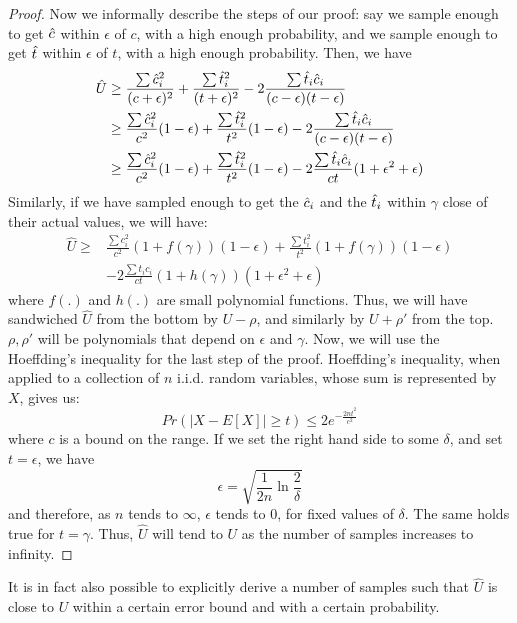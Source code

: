 {\begin{proof}
Now we informally describe the steps of our proof:
say we sample enough to get $\hat{c}$ within $\epsilon$ of $c$, with a high enough probability,
and we sample enough to get $\hat{t}$ within $\epsilon$ of $t$, with a high enough probability.
Then, we have 
\begin{align*}
\hat{U} & \geq \frac{\sum{\hc_i^2}}{(c + \epsilon)^2} +  \frac{\sum{\htt_i^2}}{(t + \epsilon)^2} - 2 \frac{\sum{\htt_i \hc_i}}{(c - \epsilon) (t - \epsilon)} \\
& \geq \frac{\sum{\hc_i^2}}{c^2} (1 - \epsilon ) +  \frac{\sum{\htt_i^2}}{t ^2} (1-\epsilon) - 2 \frac{\sum{\htt_i \hc_i}}{(c - \epsilon) (t - \epsilon)} \\
& \geq \frac{\sum{\hc_i^2}}{c^2} (1 - \epsilon ) +  \frac{\sum{\htt_i^2}}{t ^2} (1-\epsilon) - 2 \frac{\sum{\htt_i \hc_i}}{ct}(1 + \epsilon^2 + \epsilon) 
\end{align*}
Similarly, if we have sampled enough to get the $\hat{c}_i$ and the $\hat{t}_i$ within $\gamma$ close 
of their actual values, we will have:
\begin{align*}
\hat{U} \geq &  \frac{\sum{c_i^2}}{c^2} (1 + f(\gamma)) (1 - \epsilon ) +   \frac{\sum{t_i^2}}{t ^2}  (1 + f(\gamma)) (1-\epsilon) \\ & - 2 \frac{\sum{t_i c_i}}{ct}(1 + h(\gamma))(1 + \epsilon^2 + \epsilon) 
\end{align*}
where $f(.)$ and $h(.)$ are small polynomial functions.
Thus,
we will have sandwiched $\hat{U}$ from the bottom by $U-\rho$,
and similarly by $U + \rho'$ from the top.
$\rho, \rho'$ will be polynomials that depend on $\epsilon$ and $\gamma$.
Now, we will use the Hoeffding's inequality for the last step of the proof.
Hoeffding's inequality, when
applied to a collection of $n$ i.i.d. random variables,
whose sum is represented by $X$, gives us:
\begin{equation}
Pr (|X - E[X]| \geq t) \leq 2 e^{-\frac{2 n t^2}{c^2}}
\end{equation}
where $c$ is a bound on the range. 
If we set the right hand side to some $\delta$, and set $t = \epsilon$,
we have
$$ \epsilon = \sqrt{\frac{1}{2 n} \ln \frac{2}{\delta}}$$
and therefore, as $n$ tends to $\infty$, $\epsilon$ tends to $0$,
for fixed values of $\delta$.
The same holds true for $t = \gamma$.
Thus, $\hat{U}$ will tend to $U$ as the number of samples
increases to infinity.
\end{proof}

It is in fact also possible to explicitly derive a number of samples 
such that $\hat{U}$ is close to $U$ within a certain error bound
and with a certain probability. 
}%


